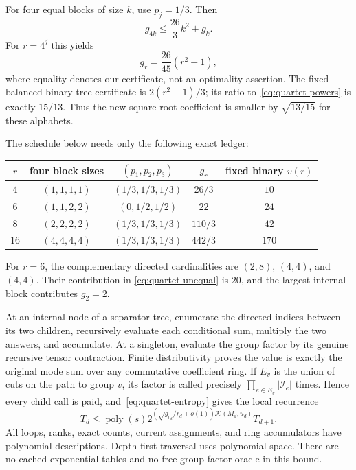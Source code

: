 For four equal blocks of size $k$, use $p_j=1/3$. Then
\[
 g_{4k}\le\frac{26}{3}k^2+g_k.
\]
For $r=4^j$ this yields
\begin{equation}\label{eq:quartet-powers}
 g_r=\frac{26}{45}(r^2-1),
\end{equation}
where equality denotes our certificate, not an optimality assertion.
The fixed balanced binary-tree certificate is $2(r^2-1)/3$; its ratio
to~\eqref{eq:quartet-powers} is exactly $15/13$. Thus the new square-root
coefficient is smaller by $\sqrt{13/15}$ for these alphabets.

The schedule below needs only the following exact ledger:
\begin{center}
\begin{tabular}{c|c|c|c|c}
$r$ & four block sizes & $(p_1,p_2,p_3)$ & $g_r$ & fixed binary $v(r)$\\\hline
4 & $(1,1,1,1)$ & $(1/3,1/3,1/3)$ & $26/3$ & $10$\\
6 & $(1,1,2,2)$ & $(0,1/2,1/2)$ & $22$ & $24$\\
8 & $(2,2,2,2)$ & $(1/3,1/3,1/3)$ & $110/3$ & $42$\\
16 & $(4,4,4,4)$ & $(1/3,1/3,1/3)$ & $442/3$ & $170$
\end{tabular}
\end{center}
For $r=6$, the complementary directed cardinalities are $(2,8)$,
$(4,4)$, and $(4,4)$. Their contribution in
\eqref{eq:quartet-unequal} is $20$, and the largest internal block
contributes $g_2=2$.

At an internal node of a separator tree, enumerate the directed indices
between its two children, recursively evaluate each conditional sum,
multiply the two answers, and accumulate. At a singleton, evaluate the
group factor by its genuine recursive tensor contraction. Finite
distributivity proves the value is exactly the original mode sum over
any commutative coefficient ring. If $E_v$ is the union of cuts on the
path to group $v$, its factor is called precisely
$\prod_{e\in E_v}|\mathcal I_e|$ times. Hence every child call is paid,
and~\eqref{eq:quartet-entropy} gives the local recurrence
\begin{equation}\label{eq:quartet-local}
 T_d\le\operatorname{poly}(s)
 2^{(\sqrt{g_{r_d}}/r_d+o(1))\mathcal K(M_d,u_d)}T_{d+1}.
\end{equation}
All loops, ranks, exact counts, current assignments, and ring accumulators
have polynomial descriptions. Depth-first traversal uses polynomial
space. There are no cached exponential tables and no free group-factor
oracle in this bound.

